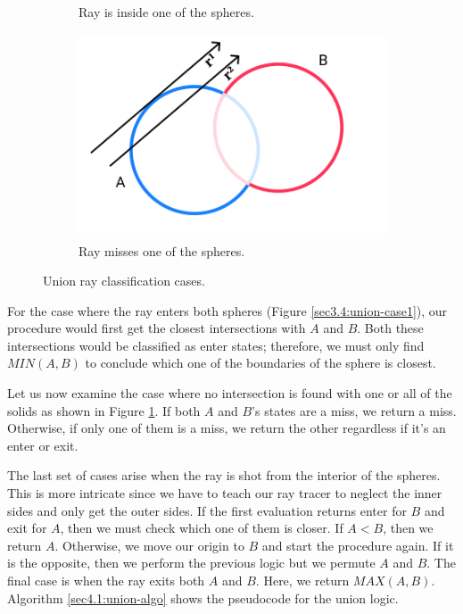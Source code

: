 \documentclass[a4paper,11pt,oneside]{article}
\begin{document}
\begin{figure}[ht]
\begin{subfigure}[b]{0.3\textwidth}
		\caption{Ray is inside one of the spheres.}
		\label{sec3.4:union-case2}
	\end{subfigure}
	\hfill
	\begin{subfigure}[b]{0.3\textwidth}
		\centering
		\includegraphics[width=\textwidth]{section4/4.1/union-case-3.png}
		\caption{Ray misses one of the spheres.}
		\label{sec3.4:union-case3}
	\end{subfigure}
	\caption{Union ray classification cases.}
	\label{sec3.4:sphere-union}
\end{figure}

For the case where the ray enters both spheres (Figure \ref{sec3.4:union-case1}), our procedure would first get the closest intersections with $A$ and $B$. Both these intersections would be classified as enter states; therefore, we must only find $MIN(A, B)$ to conclude which one of the boundaries of the sphere is closest.

Let us now examine the case where no intersection is found with one or all of the solids as shown in Figure \ref{sec3.4:union-case2}. If both $A$ and $B$'s states are a miss, we return a miss. Otherwise, if only one of them is a miss, we return the other regardless if it's an enter or exit.

The last set of cases arise when the ray is shot from the interior of the spheres. This is more intricate since we have to teach our ray tracer to neglect the inner sides and only get the outer sides. If the first evaluation returns enter for $B$ and exit for $A$, then we must check which one of them is closer. If $A < B$, then we return $A$. Otherwise, we move our origin to $B$ and start the procedure again. If it is the opposite, then we perform the previous logic but we permute $A$ and $B$. The final case is when the ray exits both $A$ and $B$. Here, we return $MAX(A, B)$. Algorithm \ref{sec4.1:union-algo} shows the pseudocode for the union logic.
\end{document}
